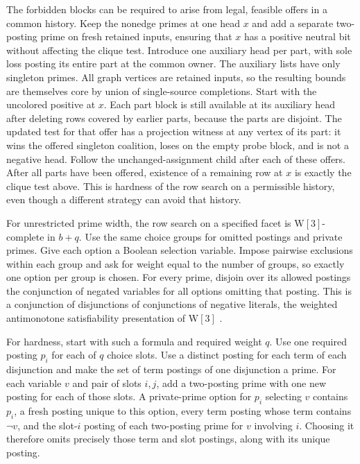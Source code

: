 The forbidden blocks can be required to arise
from legal, feasible offers in a common history.
Keep the nonedge primes at one head $x$ and
add a separate two-posting prime on fresh
retained inputs, ensuring that $x$ has a
positive neutral bit without affecting the
clique test. Introduce one auxiliary head per part, with
sole loss posting its entire part at the common
owner. The auxiliary lists have only singleton
primes. All graph vertices are retained inputs,
so the resulting bounds are themselves core by
union of single-source completions. Start with
the uncolored positive at $x$. Each part block
is still available at its auxiliary head after
deleting rows covered by earlier parts, because
the parts are disjoint. The updated test for
that offer has a projection witness at any
vertex of its part: it wins the offered
singleton coalition, loses on the empty probe
block, and is not a negative head. Follow the
unchanged-assignment child after each of these
offers. After all parts have been offered,
existence of a remaining row at $x$ is exactly
the clique test above. This is hardness of the
row search on a permissible history, even
though a different strategy can avoid that
history.

For unrestricted prime width, the row search on a
specified facet is $\mathrm W[3]$-complete in $b+q$.
Use the same choice groups for omitted postings and
private primes. Give each option a Boolean selection
variable. Impose pairwise exclusions within each
group and ask for weight equal to the number of
groups, so exactly one option per group is chosen.
For every prime, disjoin over its allowed postings
the conjunction of negated variables for all options
omitting that posting. This is a conjunction of
disjunctions of conjunctions of negative literals,
the weighted antimonotone satisfiability presentation
of $\mathrm W[3]$ \cite{KanjXia2011Normalized}.

For hardness, start with such a formula and required
weight $q$. Use one required posting $p_i$ for each
of $q$ choice slots. Use a distinct posting for each
term of each disjunction and make the set of term
postings of one disjunction a prime. For each
variable $v$ and pair of slots $i,j$, add a
two-posting prime with one new posting for each
of those slots. A private-prime option for $p_i$
selecting $v$ contains $p_i$, a fresh posting unique
to this option, every term posting whose term
contains $\neg v$, and the slot-$i$ posting of each
two-posting prime for $v$ involving $i$. Choosing
it therefore omits precisely those term and slot
postings, along with its unique posting.

